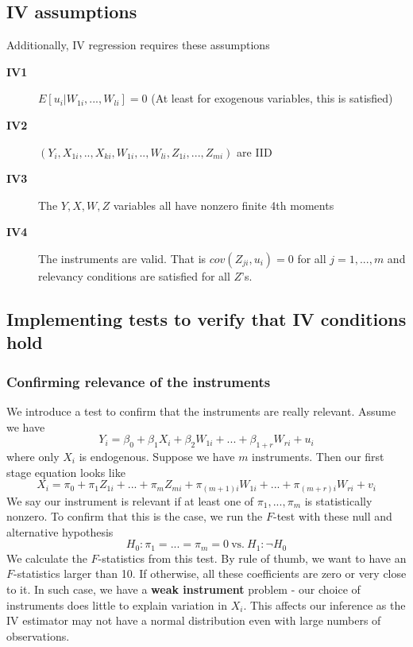 \documentclass[12pt]{article}
\theoremstyle{definition}
\theoremstyle{property}
\theoremstyle{assumption}
\theoremstyle{example}
\theoremstyle{comment}
\begin{document}
\subsection{IV assumptions}
Additionally, IV regression requires these assumptions 
\begin{description}
\item[\textbf{IV1}] $E[u_i|W_{1i},...,W_{li}]=0$ (At least for exogenous variables, this is satisfied)
\item[\textbf{IV2}] $(Y_i,X_{1i},..,X_{ki},W_{1i},..,W_{li},Z_{1i},...,Z_{mi})$ are IID
\item[\textbf{IV3}] The $Y,X,W,Z$ variables all have nonzero finite 4th moments
\item[\textbf{IV4}] The instruments are valid. That is $cov(Z_{ji},u_i)=0$ for all $j=1,...,m$ and relevancy conditions are satisfied for all $Z$'s. 
\end{description}

\subsection{Implementing tests to verify that IV conditions hold}
\subsubsection{Confirming relevance of the instruments}
We introduce a test to confirm that the instruments are really relevant. Assume we have
\[
Y_i = \beta_0 + \beta_1X_i + \beta_2 W_{1i}+...+\beta_{1+r}W_{ri}+u_i
\]
where only $X_i$ is endogenous. Suppose we have $m$ instruments. Then our first stage equation looks like
\[
X_i = \pi_0 + \pi_1Z_{1i}+...+\pi_mZ_{mi} + \pi_{(m+1)i} W_{1i}+...+ \pi_{(m+r)i}W_{ri}+v_i
\]
We say our instrument is relevant if at least one of $\pi_1,...,\pi_m$ is statistically nonzero. To confirm that this is the case, we run the $F$-test with these null and alternative hypothesis
\[
H_0: \pi_1 = ... = \pi_m=0 \ \text{vs.} \ H_1: \lnot H_0
\]
We calculate the $F$-statistics from this test. By rule of thumb, we want to have an $F$-statistics larger than 10. If otherwise, all these coefficients are zero or very close to it. In such case, we have a \textbf{weak instrument} problem - our choice of instruments does little to explain variation in $X_i$.  This affects our inference as the IV estimator may not have a normal distribution even with large numbers of observations. 
\end{document}
